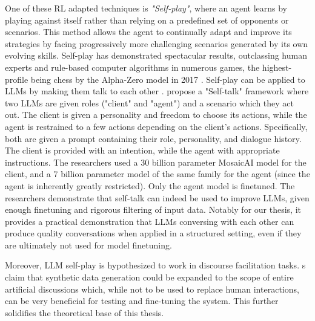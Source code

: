 One of these \ac{RL} adapted techniques is \textit{"Self-play"}, where an agent learns by playing against itself rather than relying on a predefined set of opponents or scenarios. This method allows the agent to continually adapt and improve its strategies by facing progressively more challenging scenarios generated by its own evolving skills. Self-play has demonstrated spectacular results, outclassing human experts and rule-based computer algorithms in numerous games, the highest-profile being chess by the Alpha-Zero model in 2017 \cite{silver2017masteringchessshogiselfplay}. Self-play can be applied to LLMs by making them talk to each other \cite{cheng2024selfplayingadversariallanguagegame}.  \citet{ulmer2024bootstrappingllmbasedtaskorienteddialogue} propose a "Self-talk" framework where two LLMs are given roles ("client" and "agent") and a scenario which they act out. The client is given a personality and freedom to choose its actions, while the agent is restrained to a few actions depending on the client's actions. Specifically, both are given a prompt containing their role, personality, and dialogue history. The client is provided with an intention, while the agent with appropriate instructions. The researchers used a 30 billion parameter MosaicAI \cite{MosaicML2023} model for the client, and a 7 billion parameter model of the same family for the agent (since the agent is inherently greatly restricted). Only the agent model is finetuned. The researchers demonstrate that self-talk can indeed be used to improve LLMs, given enough finetuning and rigorous filtering of input data. Notably for our thesis, it provides a practical demonstration that LLMs conversing with each other can produce quality conversations when applied in a structured setting, even if they are ultimately not used for model finetuning.

Moreover, LLM self-play is hypothesized to work in discourse facilitation tasks. \citet{small-polis-llm}s claim that synthetic data generation could be expanded to the scope of entire artificial discussions which, while not to be used to replace human interactions, can be very beneficial for testing and fine-tuning the system. This further solidifies the theoretical base of this thesis. 


